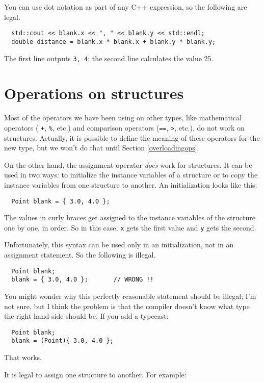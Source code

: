 You can use dot notation as part of any C++ expression, so the
following are legal.

\begin{verbatim}
  std::cout << blank.x << ", " << blank.y << std::endl;
  double distance = blank.x * blank.x + blank.y * blank.y;
\end{verbatim}
%
The first line outputs {\tt 3, 4}; the second line calculates
the value 25.

\section{Operations on structures}

Most of the operators we have been using on other types, like
mathematical operators ( {\tt +}, {\tt \%}, etc.) and comparison
operators ({\tt ==}, {\tt >}, etc.), do not work on structures.
Actually, it is possible to define the meaning of these operators
for the new type, but we won't do that until Section \ref{overloadingops}.

On the other hand, the assignment operator {\em does} work for
structures.  It can be used in two ways: to initialize the instance
variables of a structure or to copy the instance variables from one
structure to another.  An initialization looks like this:

\begin{verbatim}
  Point blank = { 3.0, 4.0 };
\end{verbatim}
%
The values in curly braces get assigned to the instance variables of
the structure one by one, in order.  So in this case, {\tt x}
gets the first value and {\tt y} gets the second.

Unfortunately, this syntax can be used only in an initialization,
not in an assignment statement.  So the following is illegal.

\begin{verbatim}
  Point blank;
  blank = { 3.0, 4.0 };       // WRONG !!
\end{verbatim}
%
You might wonder why this perfectly reasonable statement should
be illegal; I'm not sure, but I think the problem is that the compiler
doesn't know what type the right hand side should be.  If you
add a typecast:

\begin{verbatim}
  Point blank;
  blank = (Point){ 3.0, 4.0 };
\end{verbatim}
%
That works.

It is legal to assign one structure to
another.  For example:

